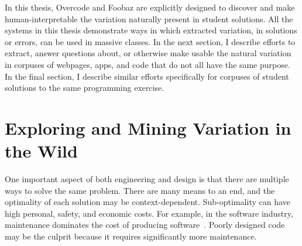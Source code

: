 In this thesis, Overcode and Foobaz are explicitly designed to discover and make human-interpretable the variation naturally present in student solutions. All the systems in this thesis demonstrate ways in which extracted variation, in solutions or errors, can be used in massive classes. In the next section, I describe efforts to extract, answer questions about, or otherwise make usable the natural variation in corpuses of webpages, apps, and code that do not all have the same purpose. In the final section, I describe similar efforts specifically for corpuses of student solutions to the same programming exercise.



\section{Exploring and Mining Variation in the Wild}

One important aspect of both engineering and design is that there are multiple ways to solve the same problem. There are many means to an end, and the optimality of each solution may be context-dependent. Sub-optimality can have high personal, safety, and economic costs. For example, in the software industry, maintenance dominates the cost of producing software~\cite{fox2013engineering}. Poorly designed code may be the culprit because it requires significantly more maintenance.

\begin{comment}
There’s no silver bullet for becoming a great engineer. However, best practices will probably always include analyzing others’ designs, highlighting their successes and failures, as well as composing one’s own designs and receiving critiques from others.

This method of training is particularly exciting today, when there is such a diversity of design examples available online. Thousands of apps are available for download from app stores. Kaggle maching learning competition submissions are not public by default, but are sometimes released by authors and collected for the benefit of others. Github and Bitbucket host millions of repositories, many of them public and searchable.
\end{comment}

